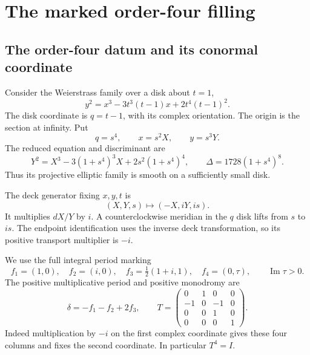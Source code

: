 \section{The marked order-four filling}\label{sec:order-four}

\subsection{The order-four datum and its conormal coordinate}

Consider the Weierstrass family over a disk about $t=1$,
\begin{equation}\label{of:eq:original}
 y^2=x^3-3t^3(t-1)x+2t^4(t-1)^2.
\end{equation}
The disk coordinate is $q=t-1$, with its complex orientation.
The origin is the section at infinity. Put
\begin{equation}\label{of:eq:reduction}
 q=s^4,\qquad x=s^2X,\qquad y=s^3Y.
\end{equation}
The reduced equation and discriminant are
\begin{equation}\label{of:eq:smooth}
 Y^2=X^3-3(1+s^4)^3X+2s^2(1+s^4)^4,
 \qquad \Delta=1728(1+s^4)^8.
\end{equation}
Thus its projective elliptic family is smooth on a sufficiently small disk.

The deck generator fixing $x,y,t$ is
\begin{equation}\label{of:eq:deck}
 (X,Y,s)\longmapsto(-X,iY,is).
\end{equation}
It multiplies $dX/Y$ by $i$. A counterclockwise meridian in the $q$ disk
lifts from $s$ to $is$. The endpoint identification uses the inverse deck
transformation, so its positive transport multiplier is $-i$.

We use the full integral period marking
\begin{equation}\label{of:eq:lattice}
 f_1=(1,0),\quad f_2=(i,0),\quad
 f_3=\tfrac12(1+i,1),\quad f_4=(0,\tau),\qquad \operatorname{Im}\tau>0.
\end{equation}
The positive multiplicative period and positive monodromy are
\begin{equation}\label{of:eq:T}
 \delta=-f_1-f_2+2f_3,
 \qquad
 T=\begin{pmatrix}0&1&0&0\\-1&0&-1&0\\0&0&1&0\\0&0&0&1\end{pmatrix}.
\end{equation}
Indeed multiplication by $-i$ on the first complex coordinate gives these
four columns and fixes the second coordinate. In particular $T^4=I$.

